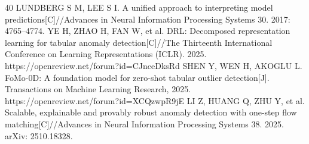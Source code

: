 \documentclass[a4paper,fleqn]{cas-dc}
\begin{document}
\begin{thebibliography}{40}
 LUNDBERG S M, LEE S I. A unified approach to interpreting model predictions[C]//Advances in Neural Information Processing Systems 30. 2017: 4765–4774.
 YE H, ZHAO H, FAN W, et al. DRL: Decomposed representation learning for tabular anomaly detection[C]//The Thirteenth International Conference on Learning Representations (ICLR). 2025. https://openreview.net/forum?id=CJnceDksRd
 SHEN Y, WEN H, AKOGLU L. FoMo-0D: A foundation model for zero-shot tabular outlier detection[J]. Transactions on Machine Learning Research, 2025. https://openreview.net/forum?id=XCQzwpR9jE
 LI Z, HUANG Q, ZHU Y, et al. Scalable, explainable and provably robust anomaly detection with one-step flow matching[C]//Advances in Neural Information Processing Systems 38. 2025. arXiv: 2510.18328.
\end{thebibliography}
\end{document}
